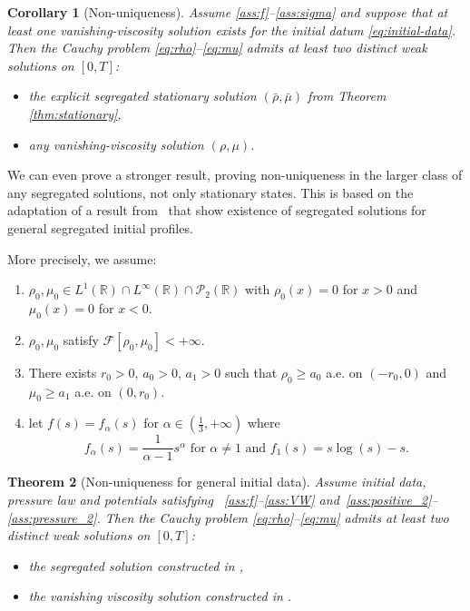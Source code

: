 \documentclass[a4paper,twosided, 11pt]{article}
\newcommand{\R}{\mathbb{R}}
\theoremstyle{plain}
\newtheorem{thm}{Theorem}[section]
\newtheorem{corollary}[thm]{Corollary}
\theoremstyle{remark}
\numberwithin{equation}{section}
\begin{document}
\begin{corollary}[Non-uniqueness]
\label{cor:nonunique}
Assume \ref{ass:f}--\ref{ass:sigma} and suppose that at least one vanishing-viscosity solution exists for the initial datum \eqref{eq:initial-data}. Then the Cauchy problem \eqref{eq:rho}--\eqref{eq:mu} admits at least two distinct weak solutions on $[0,T]$:
\begin{itemize}
\item the explicit segregated stationary solution $(\bar\rho,\bar\mu)$ from Theorem \ref{thm:stationary}, 
\item any vanishing-viscosity solution $(\rho,\mu)$.
\end{itemize}
\end{corollary}

We can even prove a stronger result, proving non-uniqueness in the larger class of any segregated solutions, not only stationary states. This is based on the adaptation of a result from~\cite{santambrogioschulz2026segregated} that show existence of segregated solutions for general segregated initial profiles.

\medskip 


More precisely, we assume:
\begin{enumerate}[label=(B\arabic*)]
    \item \label{ass:positive_2}$\rho_0,\mu_0\in L^{1}(\R)\cap L^\infty(\R)\cap \mathscr{P}_2(\R)$ with $\rho_0(x) = 0$ for $ x > 0 $ and $\mu_0(x) =0 $ for $x< 0$. 
    \item \label{ass:energy_2} $\rho_0,\mu_0$ satisfy $\mathcal{F}[\rho_0,\mu_0] < + \infty$.
    \item \label{ass:interface_2} There exists $r_0>0$, $a_0>0$, $a_1>0$  such that $\rho_0\ge a_0$ a.e. on $(-r_0,0)$ and $\mu_0\ge a_1$ a.e. on $(0,r_0)$.  
    \item \label{ass:pressure_2} let $f(s) = f_\alpha(s)$ for $\alpha \in (\frac{1}{3},+\infty)$ where 
    \[
    f_\alpha(s) = \frac{1}{\alpha-1}s^\alpha \text{ for } \alpha \neq 1 \text{ and } f_1(s) = s\log(s) -s.
    \]
\end{enumerate}

\begin{thm}[Non-uniqueness for general initial data]
\label{thm:nonuniqueness-general}
Assume initial data, pressure law and potentials satisfying ~\ref{ass:f}--\ref{ass:VW} and~\ref{ass:positive_2}--\ref{ass:pressure_2}. 
Then the Cauchy problem \eqref{eq:rho}--\eqref{eq:mu} admits at least two distinct weak solutions on $[0,T]$:
\begin{itemize}
\item the segregated solution constructed in \cite{santambrogioschulz2026segregated},
\item the vanishing viscosity solution constructed in \cite{Skrzeczkowski2026crossdiffusion}.
\end{itemize}
\end{thm}
\end{document}
